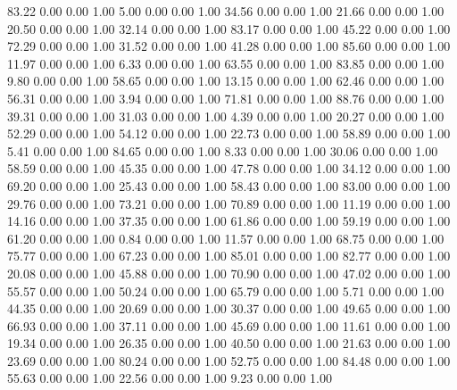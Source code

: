    83.22   0.00   0.00   1.00
    5.00   0.00   0.00   1.00
   34.56   0.00   0.00   1.00
   21.66   0.00   0.00   1.00
   20.50   0.00   0.00   1.00
   32.14   0.00   0.00   1.00
   83.17   0.00   0.00   1.00
   45.22   0.00   0.00   1.00
   72.29   0.00   0.00   1.00
   31.52   0.00   0.00   1.00
   41.28   0.00   0.00   1.00
   85.60   0.00   0.00   1.00
   11.97   0.00   0.00   1.00
    6.33   0.00   0.00   1.00
   63.55   0.00   0.00   1.00
   83.85   0.00   0.00   1.00
    9.80   0.00   0.00   1.00
   58.65   0.00   0.00   1.00
   13.15   0.00   0.00   1.00
   62.46   0.00   0.00   1.00
   56.31   0.00   0.00   1.00
    3.94   0.00   0.00   1.00
   71.81   0.00   0.00   1.00
   88.76   0.00   0.00   1.00
   39.31   0.00   0.00   1.00
   31.03   0.00   0.00   1.00
    4.39   0.00   0.00   1.00
   20.27   0.00   0.00   1.00
   52.29   0.00   0.00   1.00
   54.12   0.00   0.00   1.00
   22.73   0.00   0.00   1.00
   58.89   0.00   0.00   1.00
    5.41   0.00   0.00   1.00
   84.65   0.00   0.00   1.00
    8.33   0.00   0.00   1.00
   30.06   0.00   0.00   1.00
   58.59   0.00   0.00   1.00
   45.35   0.00   0.00   1.00
   47.78   0.00   0.00   1.00
   34.12   0.00   0.00   1.00
   69.20   0.00   0.00   1.00
   25.43   0.00   0.00   1.00
   58.43   0.00   0.00   1.00
   83.00   0.00   0.00   1.00
   29.76   0.00   0.00   1.00
   73.21   0.00   0.00   1.00
   70.89   0.00   0.00   1.00
   11.19   0.00   0.00   1.00
   14.16   0.00   0.00   1.00
   37.35   0.00   0.00   1.00
   61.86   0.00   0.00   1.00
   59.19   0.00   0.00   1.00
   61.20   0.00   0.00   1.00
    0.84   0.00   0.00   1.00
   11.57   0.00   0.00   1.00
   68.75   0.00   0.00   1.00
   75.77   0.00   0.00   1.00
   67.23   0.00   0.00   1.00
   85.01   0.00   0.00   1.00
   82.77   0.00   0.00   1.00
   20.08   0.00   0.00   1.00
   45.88   0.00   0.00   1.00
   70.90   0.00   0.00   1.00
   47.02   0.00   0.00   1.00
   55.57   0.00   0.00   1.00
   50.24   0.00   0.00   1.00
   65.79   0.00   0.00   1.00
    5.71   0.00   0.00   1.00
   44.35   0.00   0.00   1.00
   20.69   0.00   0.00   1.00
   30.37   0.00   0.00   1.00
   49.65   0.00   0.00   1.00
   66.93   0.00   0.00   1.00
   37.11   0.00   0.00   1.00
   45.69   0.00   0.00   1.00
   11.61   0.00   0.00   1.00
   19.34   0.00   0.00   1.00
   26.35   0.00   0.00   1.00
   40.50   0.00   0.00   1.00
   21.63   0.00   0.00   1.00
   23.69   0.00   0.00   1.00
   80.24   0.00   0.00   1.00
   52.75   0.00   0.00   1.00
   84.48   0.00   0.00   1.00
   55.63   0.00   0.00   1.00
   22.56   0.00   0.00   1.00
    9.23   0.00   0.00   1.00
